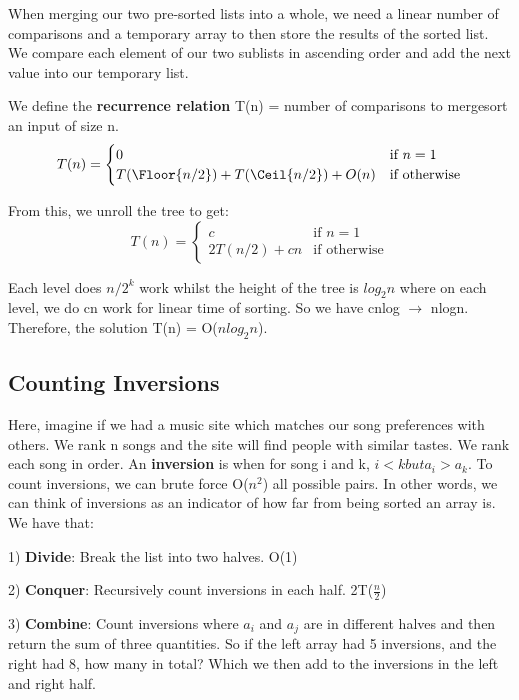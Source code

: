 \documentclass[11pt, oneside]{article}
\theoremstyle{definition}
\DeclarePairedDelimiter\Floor\lfloor\rfloor
\DeclarePairedDelimiter\Ceil\lceil\rceil
\begin{document}
When merging our two pre-sorted lists into a whole, we need a linear number of comparisons and a temporary array to then store the results of the sorted list. We compare each element of our two sublists in ascending order and add the next value into our temporary list.

We define the \textbf{recurrence relation} T(n) = number of comparisons to mergesort an input of size n.
\[
  T(n) =
  \begin{cases}
            0 & \text{if $n=1$} \\
            T(\Floor{n/2}) + T(\Ceil{n/2}) + O(n) & \text{if otherwise}
  \end{cases}
\]

From this, we unroll the tree to get:
\[
  T(n) =
  \begin{cases}
            c & \text{if $n=1$} \\
            2T(n/2) + cn & \text{if otherwise}
  \end{cases}
\]

Each level does $n/2^k$ work whilst the height of the tree is $log_2n$ where on each level, we do cn work for linear time of sorting. So we have cnlog $\rightarrow$ nlogn. Therefore, the solution T(n) = O($nlog_2n$).

\subsection{Counting Inversions}
Here, imagine if we had a music site which matches our song preferences with others. We rank n songs and the site will find people with similar tastes. We rank each song in order. An \textbf{inversion} is when for song i and k, $i<k but a_i>a_k$. To count inversions, we can brute force O($n^2$) all possible pairs. In other words, we can think of inversions as an indicator of how far from being sorted an array is. We have that:

1) \textbf{Divide}: Break the list into two halves. O(1)

2) \textbf{Conquer}: Recursively count inversions in each half. 2T($\frac{n}{2}$)

3) \textbf{Combine}: Count inversions where $a_i$ and $a_j$ are in different halves and then return the sum of three quantities. So if the left array had 5 inversions, and the right had 8, how many in total? Which we then add to the inversions in the left and right half.
\end{document}
